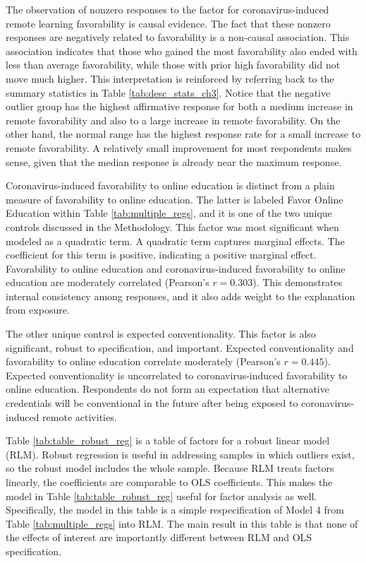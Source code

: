 The observation of nonzero responses to the factor for coronavirus-induced remote learning favorability is causal evidence.
The fact that these nonzero responses are negatively related to favorability is a non-causal association.
This association indicates that those who gained the most favorability also ended with less than average favorability,
while those with prior high favorability did not move much higher.
This interpretation is reinforced by referring back to the summary statistics in Table \ref{tab:desc_stats_ch3}.
Notice that the negative outlier group has the highest affirmative response for both a
medium increase in remote favorability
and also to a large increase in remote favorability.
On the other hand, the normal range has the highest response rate for a small increase to remote favorability.
A relatively small improvement for most respondents makes sense,
given that the median response is already near the maximum response.

Coronavirus-induced favorability to online education is distinct from a plain measure of favorability to online education.
The latter is labeled Favor Online Education within Table \ref{tab:multiple_regs},
and it is one of the two unique controls discussed in the Methodology.
This factor was most significant when modeled as a quadratic term.
A quadratic term captures marginal effects.
The coefficient for this term is positive, indicating a positive marginal effect.
Favorability to online education
and coronavirus-induced favorability to online education are moderately correlated (Pearson's $r=0.303$).
This demonstrates internal consistency among responses,
and it also adds weight to the explanation from exposure.

The other unique control is expected conventionality.
This factor is also significant, robust to specification, and important.
Expected conventionality and favorability to online education correlate moderately (Pearson's $r=0.445$).
Expected conventionality is uncorrelated to coronavirus-induced favorability to online education.
Respondents do not form an expectation that alternative credentials will be conventional in the future
after being exposed to coronavirus-induced remote activities.

Table \ref{tab:table_robust_reg} is a table of factors for a robust linear model (RLM).
Robust regression is useful in addressing samples in which outliers exist, so the robust model includes the whole sample.
Because RLM treats factors linearly, the coefficients are comparable to OLS coefficients.
This makes the model in Table \ref{tab:table_robust_reg} useful for factor analysis as well.
Specifically, the model in this table is a simple respecification of Model 4 from Table \ref{tab:multiple_regs} into RLM.
The main result in this table is that none of the effects of interest are importantly different between RLM and OLS specification.

